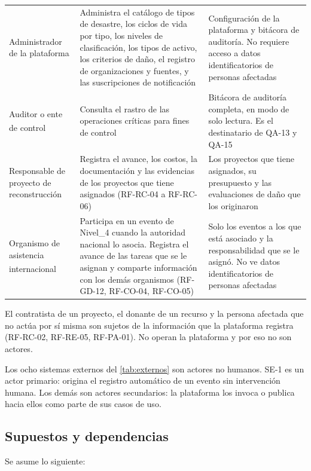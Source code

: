 \documentclass[11pt,letterpaper]{article}
\newcommand{\derivado}{\textsuperscript{\textdagger}}
\begin{document}
\begin{longtable}{L{3.2cm} L{6.0cm} L{6.6cm}}
Administrador de la plataforma & Administra el catálogo de tipos de desastre, los ciclos de vida
por tipo, los niveles de clasificación, los tipos de activo, los criterios de daño, el registro de
organizaciones y fuentes, y las suscripciones de notificación & Configuración de la plataforma y
bitácora de auditoría. No requiere acceso a datos identificatorios de personas afectadas \\
Auditor o ente de control\derivado & Consulta el rastro de las operaciones críticas para fines de
control & Bitácora de auditoría completa, en modo de solo lectura. Es el destinatario de QA-13 y
QA-15 \\
Responsable de proyecto de reconstrucción & Registra el avance, los costos, la documentación y las
evidencias de los proyectos que tiene asignados (RF-RC-04 a RF-RC-06) & Los proyectos que tiene
asignados, su presupuesto y las evaluaciones de daño que los originaron \\
Organismo de asistencia internacional\derivado & Participa en un evento de Nivel\_4 cuando la
autoridad nacional lo asocia. Registra el avance de las tareas que se le asignan y comparte
información con los demás organismos (RF-GD-12, RF-CO-04, RF-CO-05) & Solo los eventos a los que
está asociado y la responsabilidad que se le asignó. No ve datos identificatorios de personas
afectadas \\
\end{longtable}

El contratista de un proyecto, el donante de un recurso y la persona afectada que no actúa por sí
misma son sujetos de la información que la plataforma registra (RF-RC-02, RF-RE-05, RF-PA-01). No
operan la plataforma y por eso no son actores.

Los ocho sistemas externos del \cref{tab:externos} son actores no humanos. SE-1 es un actor
primario: origina el registro automático de un evento sin intervención humana. Los demás son actores
secundarios: la plataforma los invoca o publica hacia ellos como parte de sus casos de uso.

\subsection{Supuestos y dependencias}

Se asume lo siguiente:
\end{document}
